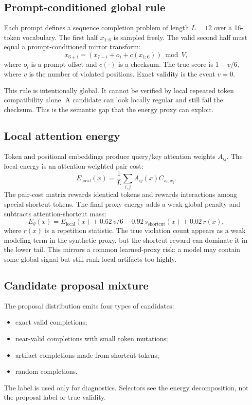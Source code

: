 \documentclass{article}
\newcommand{\energy}{E_\theta}
\newcommand{\short}{s_{\mathrm{shortcut}}}
\begin{document}
\subsection{Prompt-conditioned global rule}

Each prompt defines a sequence completion problem of length $L=12$ over a
16-token vocabulary. The first half $x_{1:6}$ is sampled freely. The valid
second half must equal a prompt-conditioned mirror transform:
\[
  x_{6+i} = (x_{7-i} + o_i + c(x_{1:6})) \bmod V,
\]
where $o_i$ is a prompt offset and $c(\cdot)$ is a checksum. The true score is
$1-v/6$, where $v$ is the number of violated positions. Exact validity is the
event $v=0$.

This rule is intentionally global. It cannot be verified by local repeated
token compatibility alone. A candidate can look locally regular and still fail
the checksum. This is the semantic gap that the energy proxy can exploit.

\subsection{Local attention energy}

Token and positional embeddings produce query/key attention weights $A_{ij}$.
The local energy is an attention-weighted pair cost:
\[
  E_{\mathrm{local}}(x)=\frac{1}{L}\sum_{i,j} A_{ij}(x) C_{x_i,x_j}.
\]
The pair-cost matrix rewards identical tokens and rewards interactions among
special shortcut tokens. The final proxy energy adds a weak global penalty and
subtracts attention-shortcut mass:
\[
  \energy(x)=E_{\mathrm{local}}(x)+0.62\,v/6
  -0.92\,\short(x)+0.02\,r(x),
\]
where $r(x)$ is a repetition statistic. The true violation count appears as a
weak modeling term in the synthetic proxy, but the shortcut reward can dominate
it in the lower tail. This mirrors a common learned-proxy risk: a model may
contain some global signal but still rank local artifacts too highly.

\subsection{Candidate proposal mixture}

The proposal distribution emits four types of candidates:
\begin{itemize}
  \item exact valid completions;
  \item near-valid completions with small token mutations;
  \item artifact completions made from shortcut tokens;
  \item random completions.
\end{itemize}
The label is used only for diagnostics. Selectors see the energy decomposition,
not the proposal label or true validity.
\end{document}
